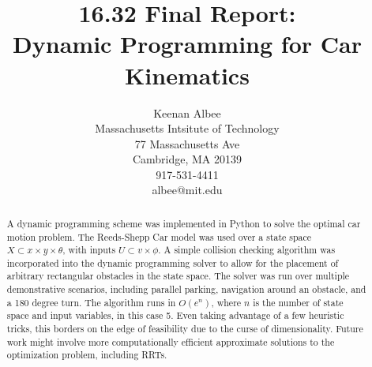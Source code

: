 \documentclass[twocolumn,letterpaper]{IEEEAerospaceCLS}  %
\begin{document}
\title{16.32 Final Report:\\ Dynamic Programming for Car Kinematics}

\author{%
Keenan Albee\\ 
Massachusetts Intsitute of Technology\\
77 Massachusetts Ave\\
Cambridge, MA 20139\\
917-531-4411\\
albee@mit.edu
}


\maketitle

\thispagestyle{plain}
\pagestyle{plain}

\begin{abstract}
A dynamic programming scheme was implemented in Python to solve the optimal car motion problem. The Reeds-Shepp Car model was used over a state space $X \subset x \times y \times \theta$, with inputs $U \subset v \times \phi$. A simple collision checking algorithm was incorporated into the dynamic programming solver to allow for the placement of arbitrary rectangular obstacles in the state space. The solver was run over multiple demonstrative scenarios, including parallel parking, navigation around an obstacle, and a 180 degree turn. The algorithm runs in $O(e^n)$, where $n$ is the number of state space and input variables, in this case 5. Even taking advantage of a few heuristic tricks, this borders on the edge of feasibility due to the curse of dimensionality. Future work might involve more computationally efficient approximate solutions to the optimization problem, including RRTs.
\end{abstract}
\end{document}
